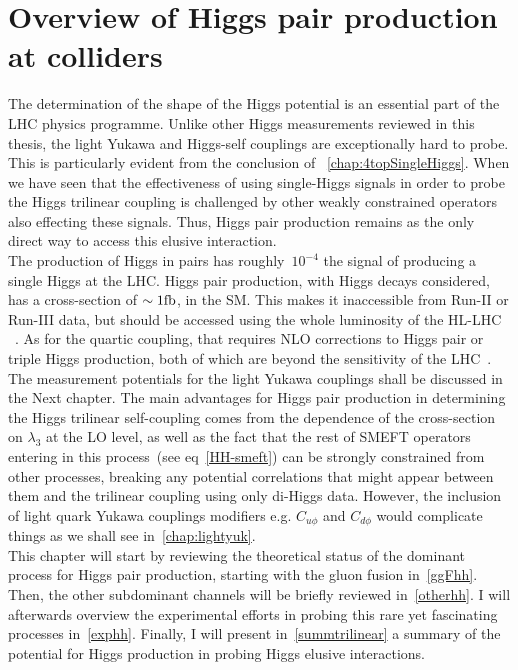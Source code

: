
\chapter{ Overview of Higgs pair production at colliders }\label{chap:overviewDiHiggs}
The determination of the shape of the Higgs potential is an essential part of the LHC physics programme. Unlike other Higgs measurements reviewed in this thesis, the light Yukawa and Higgs-self couplings  are exceptionally hard to probe.  This is particularly evident from the conclusion of ~\autoref{chap:4topSingleHiggs}. When we have seen that the effectiveness of using single-Higgs signals in order to probe the Higgs trilinear coupling is challenged by other weakly constrained operators also effecting these signals. Thus, Higgs pair production remains as the only direct way to access this elusive interaction. \\ The production of Higgs in pairs has roughly~$ 10^{-4} $ the signal of producing a single Higgs at the LHC. Higgs pair production, with Higgs decays considered, has a cross-section of $ \sim 1 \si{\femtobarn}$, in the SM. This makes it inaccessible from Run-II or Run-III data, but should be accessed using the whole luminosity of the HL-LHC ~\cite{Apollinari:2015bam,ATL-PHYS-PUB-2018-053,Cepeda:2019klc}. As for the quartic coupling, that requires NLO corrections to Higgs pair or triple Higgs production, both of which are beyond the sensitivity of the LHC~\cite{Plehn:2005nk}. The measurement potentials for the light Yukawa couplings shall be discussed in the Next chapter.   The main advantages for Higgs pair production in determining the Higgs trilinear self-coupling comes from the dependence of the cross-section on $\lambda_3$ at the LO level, as well as the fact that the rest of SMEFT operators entering in this process~(see eq~\eqref{HH-smeft}) can be strongly constrained from other processes, breaking any potential correlations that might appear between them and the trilinear coupling using only di-Higgs data. However, the inclusion of light quark Yukawa couplings modifiers e.g. $ C_{u\phi}$ and $C_{d \phi}$ would complicate things as we shall see in~\autoref{chap:lightyuk}. \\
This chapter will start by reviewing the theoretical status of the dominant process for Higgs pair production, starting with the gluon fusion in~\autoref{ggFhh}. Then, the other subdominant channels will be briefly reviewed in~\autoref{otherhh}. I will afterwards overview the experimental efforts in probing this rare yet fascinating processes in~\autoref{exphh}. Finally, I will present  in~\autoref{summtrilinear} a summary of the potential for Higgs production in probing Higgs elusive interactions.
